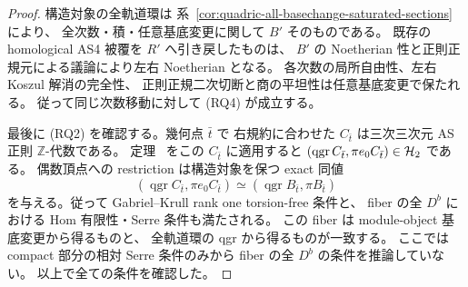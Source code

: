\begin{proof}
構造対象の全軌道環は
系~\ref{cor:quadric-all-basechange-saturated-sections} により、
全次数・積・任意基底変更に関して $B'$ そのものである。
既存の homological AS4 被覆を $R'$ へ引き戻したものは、
$B'$ の Noetherian 性と正則正規元による議論により左右 Noetherian となる。
各次数の局所自由性、左右 Koszul 解消の完全性、
正則正規二次切断と商の平坦性は任意基底変更で保たれる。
従って同じ次数移動に対して (RQ4) が成立する。

最後に (RQ2) を確認する。幾何点 $\bar t$ で
右規約に合わせた $C_{\bar t}$ は三次三次元 AS 正則
$\mathbb Z$-代数である。
定理~\cite[\texttt{thm:all-admissible-inverse}]{QuadricIntrinsic2026} をこの $C_{\bar t}$ に適用すると
$(\operatorname{qgr}C_{\bar t},\pi e_0C_{\bar t})\in\mathcal H_2$ である。
偶数頂点への restriction は構造対象を保つ exact 同値
\[
 (\operatorname{qgr}C_{\bar t},\pi e_0C_{\bar t})
   \simeq(\operatorname{qgr}B_{\bar t},\pi B_{\bar t})
\]
を与える。従って Gabriel--Krull rank one torsion-free 条件と、
fiber の全 $D^b$ における Hom 有限性・Serre 条件も満たされる。
この fiber は module-object 基底変更から得るものと、
全軌道環の qgr から得るものが一致する。
ここでは compact 部分の相対 Serre 条件のみから
fiber の全 $D^b$ の条件を推論していない。
以上で全ての条件を確認した。
\end{proof}
